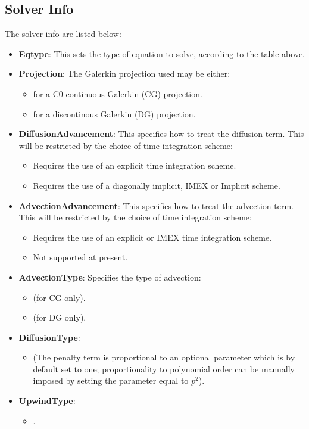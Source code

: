 \subsection{Solver Info}

The solver info are listed below:
\begin{itemize}
\item \textbf{Eqtype}: This sets the type of equation to solve, according to the table above.

\item \textbf{Projection}: The Galerkin projection used may be either:
\begin{itemize}
	\item {} for a C0-continuous Galerkin (CG) projection.
	\item {} for a discontinous Galerkin (DG) projection.
\end{itemize}
\item \textbf{DiffusionAdvancement}: This specifies how to treat the diffusion term. This will be restricted by the choice of time integration scheme:
\begin{itemize}
	\item {} Requires the use of an explicit time integration
	scheme.
	\item {} Requires the use of a diagonally implicit, IMEX or
	Implicit scheme.
\end{itemize}
\item \textbf{AdvectionAdvancement}: This specifies how to treat the advection term. This will be restricted by the choice of time integration scheme:
\begin{itemize}
	\item {} Requires the use of an explicit or IMEX time integration
	scheme.
	\item {} Not supported at present.
\end{itemize}
\item \textbf{AdvectionType}: Specifies the type of advection:
\begin{itemize}
	\item {} (for CG only).
	\item {} (for DG only).
\end{itemize}
\item \textbf{DiffusionType}:
\begin{itemize}
	\item {} (The penalty term is proportional to an optional parameter  which is by default set to one; proportionality to polynomial order can be manually imposed by setting the parameter  equal to $p^2$).
\end{itemize}
\item \textbf{UpwindType}:
\begin{itemize}
	\item {}.
\end{itemize}
\end{itemize}

